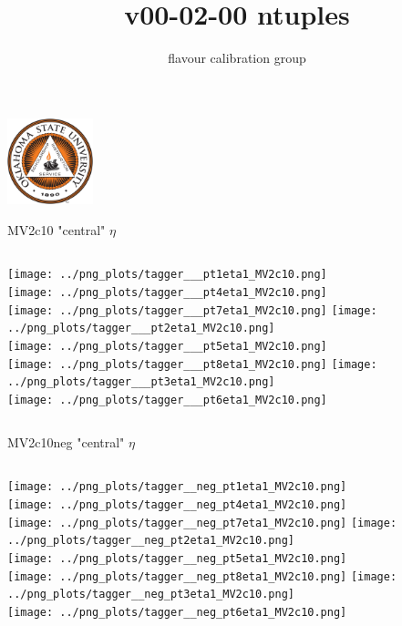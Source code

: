 \documentclass[pdflatex,8pt]{beamer}
\title[Summary plots]{v00-02-00 ntuples}
\author[D. Jamin]{flavour calibration group}
\institute[Oklahoma State University]{}
\begin{document}
  \begin{frame}[plain]
    \titlepage
        \begin{center}
    \vspace{-3em}
    \includegraphics[width=2.5cm]{OSU_logo.png}\hspace{10pt} 
    \end{center}
  \end{frame}
  \small


\begin{frame}{MV2c10 "central" $\eta$}
  \begin{columns}[t]
    \centering
    \texttt{[image: ../png\_plots/tagger\_\_\_pt1eta1\_MV2c10.png]}\\
    \texttt{[image: ../png\_plots/tagger\_\_\_pt4eta1\_MV2c10.png]}\\
    \texttt{[image: ../png\_plots/tagger\_\_\_pt7eta1\_MV2c10.png]}
    \centering
    \texttt{[image: ../png\_plots/tagger\_\_\_pt2eta1\_MV2c10.png]}\\
    \texttt{[image: ../png\_plots/tagger\_\_\_pt5eta1\_MV2c10.png]}\\
    \texttt{[image: ../png\_plots/tagger\_\_\_pt8eta1\_MV2c10.png]}
    \centering
    \texttt{[image: ../png\_plots/tagger\_\_\_pt3eta1\_MV2c10.png]}\\
    \texttt{[image: ../png\_plots/tagger\_\_\_pt6eta1\_MV2c10.png]}
  \end{columns}
\end{frame}

\begin{frame}{MV2c10neg "central" $\eta$}
  \begin{columns}[t]
    \centering
    \texttt{[image: ../png\_plots/tagger\_\_neg\_pt1eta1\_MV2c10.png]}\\
    \texttt{[image: ../png\_plots/tagger\_\_neg\_pt4eta1\_MV2c10.png]}\\
    \texttt{[image: ../png\_plots/tagger\_\_neg\_pt7eta1\_MV2c10.png]}
    \centering
    \texttt{[image: ../png\_plots/tagger\_\_neg\_pt2eta1\_MV2c10.png]}\\
    \texttt{[image: ../png\_plots/tagger\_\_neg\_pt5eta1\_MV2c10.png]}\\
    \texttt{[image: ../png\_plots/tagger\_\_neg\_pt8eta1\_MV2c10.png]}
    \centering
    \texttt{[image: ../png\_plots/tagger\_\_neg\_pt3eta1\_MV2c10.png]}\\
    \texttt{[image: ../png\_plots/tagger\_\_neg\_pt6eta1\_MV2c10.png]}
  \end{columns}
\end{frame}
\end{document}
